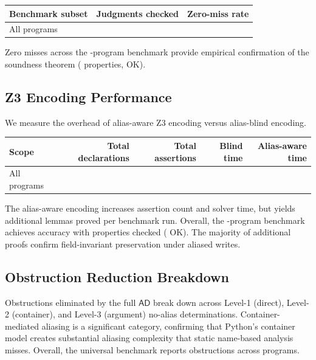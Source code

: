 \documentclass[11pt]{article}
\newcommand{\AD}{\mathsf{AD}}               %
\begin{document}
\begin{center}
\begin{tabular}{lrr}
  \toprule
  Benchmark subset & Judgments checked & Zero-miss rate \\
  \midrule
  All programs & \ppEighteenPropsTotal{} & \ppEighteenZeroMissRate{} \\
  \bottomrule
\end{tabular}
\end{center}

Zero misses across the \expTotalPrograms-program benchmark provide empirical
confirmation of the soundness theorem (\expPropsSum{} properties, \expPropsOkSum{} OK).

\subsection{Z3 Encoding Performance}

We measure the overhead of alias-aware Z3 encoding versus alias-blind
encoding.

\begin{center}
\begin{tabular}{lrrrr}
  \toprule
  Scope & Total declarations & Total assertions & Blind time & Alias-aware time \\
  \midrule
  All programs & \ppEighteenTotalDeclarations{} & \ppEighteenTotalAssertions{} & \ppEighteenBlindEncodeTime{} & \ppEighteenAwareEncodeTime{} \\
  \bottomrule
\end{tabular}
\end{center}

The alias-aware encoding increases assertion count and solver
time, but yields additional lemmas proved per benchmark
run.  Overall, the \expTotalPrograms-program benchmark achieves \expAccuracy{}
accuracy with \expPropsSum{} properties checked (\expPropsOkSum{} OK).
The majority of additional proofs confirm field-invariant preservation under aliased writes.

\subsection{Obstruction Reduction Breakdown}

Obstructions eliminated by the full $\AD$ break down across
Level-1 (direct), Level-2 (container), and Level-3 (argument)
no-alias determinations.
Container-mediated aliasing is a significant
category, confirming that Python's container model creates substantial
aliasing complexity that static name-based analysis misses.
Overall, the universal benchmark reports \expObstructionTotal{} obstructions
across \expTotalPrograms{} programs.
\end{document}
